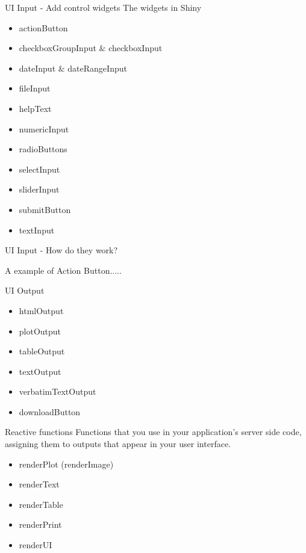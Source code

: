 \documentclass[compress]{beamer}
\begin{document}
\begin{frame}[fragile]{UI Input - Add control widgets}
The widgets in Shiny
\begin{tcolorbox}[colback=green!5,colframe=green!40!black]
\begin{itemize}
  \item actionButton
  \item checkboxGroupInput $\&$ checkboxInput
  \item dateInput $\&$ dateRangeInput
  \item fileInput	
  \item helpText	
  \item numericInput	
  \item radioButtons	
  \item selectInput	
  \item sliderInput	
  \item submitButton	
  \item textInput	 
\end{itemize}
\end{tcolorbox}
\end{frame}

\begin{frame}[fragile]{UI Input - How do they work?}
\begin{tcolorbox}[colback=green!5,colframe=green!40!black]
A example of Action Button.....
\end{tcolorbox}
\end{frame}

\begin{frame}[fragile]{UI Output}
\begin{tcolorbox}[colback=green!5,colframe=green!40!black, title=ui.R]
\begin{itemize}
  \item htmlOutput
  \item plotOutput
  \item tableOutput
  \item textOutput	
  \item verbatimTextOutput	
  \item downloadButton	
\end{itemize}
\end{tcolorbox}
\end{frame}

\begin{frame}[fragile]{Reactive functions}
Functions that you use in your application's server side code, assigning them to outputs that appear in your user interface.
\begin{tcolorbox}[colback=green!5,colframe=green!40!black, title=server.R]
\begin{itemize}
  \item \alert{renderPlot} (renderImage) 
  \item \alert{renderText} 	
  \item \alert{renderTable} 	
  \item \alert{renderPrint} 
  \item \alert{renderUI}	
\end{itemize}
\end{tcolorbox}
\end{frame}
\end{document}
